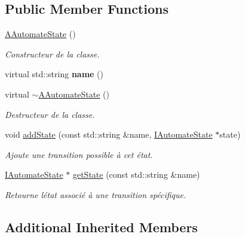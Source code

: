 \subsection*{Public Member Functions}
\begin{DoxyCompactItemize}
\item 
\mbox{\label{classAAutomateState_adaca6ae61aacda9bb75b3acee9d951d1}} 
\hyperlink{classAAutomateState_adaca6ae61aacda9bb75b3acee9d951d1}{A\+Automate\+State} ()
\begin{DoxyCompactList}\small\item\em Constructeur de la classe. \end{DoxyCompactList}\item 
\mbox{\label{classAAutomateState_a3116f6449e6eb43d2610bfa049d70f00}} 
virtual std\+::string {\bfseries name} ()
\item 
\mbox{\label{classAAutomateState_ad69fc5adb9a6f0ccbbebea324e55c532}} 
virtual \hyperlink{classAAutomateState_ad69fc5adb9a6f0ccbbebea324e55c532}{$\sim$\+A\+Automate\+State} ()
\begin{DoxyCompactList}\small\item\em Destructeur de la classe. \end{DoxyCompactList}\item 
void \hyperlink{classAAutomateState_a2f141db7bda71b605195c3516b0dac51}{add\+State} (const std\+::string \&name, \hyperlink{classIAutomateState}{I\+Automate\+State} $\ast$state)
\begin{DoxyCompactList}\small\item\em Ajoute une transition possible à cet état. \end{DoxyCompactList}\item 
\hyperlink{classIAutomateState}{I\+Automate\+State} $\ast$ \hyperlink{classAAutomateState_a98966c27660941825dba0da7130a957f}{get\+State} (const std\+::string \&name)
\begin{DoxyCompactList}\small\item\em Retourne l\textquotesingle{}état associé à une transition spécifique. \end{DoxyCompactList}\end{DoxyCompactItemize}
\subsection*{Additional Inherited Members}


